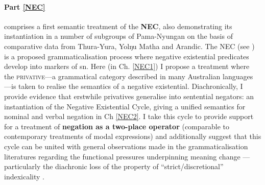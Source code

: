 \documentclass[12pt,dvipsnames]{report}
\begin{document}

 
\paragraph{Part \ref{NEC}} comprises a first semantic treatment of the \textbf{\acrfull{NEC}}, also demonstrating its instantiation in a number of subgroups of Pama-Nyungan on the basis of comparative data from Thura-Yura, Yolŋu Matha and Arandic. The \acrlong{NEC} (see \citealt{Croft1991,Veselinova2016}) is a proposed grammaticalisation process where negative existential predicates develop into markers of \acrlong{sn}. Here (in Ch. \ref{NEC1}) I propose a treatment where the \textsc{privative}---a grammatical category described in many Australian languages \citep[\textit{e.g.},][]{Dixon2002a,Phillips2021b}---is taken to realise the semantics of a negative existential. Diachronically, I provide evidence that erstwhile privatives generalise into sentential negators: an instantiation of the Negative Existential Cycle, giving a unified semantics for nominal and verbal negation in Ch \ref{NEC2}. I take this cycle to provide support for a treatment of \textbf{negation as a two-place operator} (comparable to contemporary treatments of modal expressions) and additionally suggest that this cycle can be united with general observations made in the grammaticalisation literatures regarding the functional pressures underpinning meaning change --- particularly the diachronic loss of the property of ``strict/discretional'' indexicality \citep[see][]{Perry2012}.
 
\end{document}
